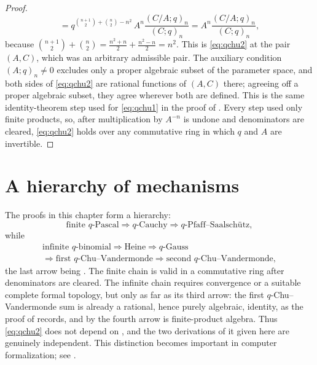 \documentclass[11pt,oneside,openany]{book}
\theoremstyle{definition}
\theoremstyle{remark}
\newcommand{\C}{\mathbb C}
\newcommand{\Q}{\mathbb Q}
\begin{document}
\begin{proof}
\[ =q^{\binom{n+1}{2}+\binom n2-n^2}\,A^{n}\frac{(C/A;q)_n}{(C;q)_n}
 =A^{n}\frac{(C/A;q)_n}{(C;q)_n},
\]
because $\binom{n+1}{2}+\binom n2=\tfrac{n^2+n}{2}+\tfrac{n^2-n}{2}=n^2$.  This is \eqref{eq:qchu2} at the pair $(A,C)$, which was an arbitrary admissible pair.  The auxiliary condition $(A;q)_n\ne0$ excludes only a proper algebraic
subset of the parameter space, and both sides of \eqref{eq:qchu2} are
rational functions of $(A,C)$ there; agreeing off a proper algebraic
subset, they agree wherever both are defined.  This is the same
identity-theorem step used for \eqref{eq:qchu1} in the proof of
.
Every step used only finite products, so, after multiplication by $A^{-n}$ is undone and denominators are cleared, \eqref{eq:qchu2} holds over any commutative ring in which $q$ and $A$ are invertible.
\end{proof}


\section{A hierarchy of mechanisms}

The proofs in this chapter form a hierarchy:
\[
 \text{finite $q$-Pascal}
 \Longrightarrow \text{$q$-Cauchy}
 \Longrightarrow \text{$q$-Pfaff--Saalsch\"utz},
\]
while
\[
\begin{gathered}
 \text{infinite $q$-binomial}
 \Longrightarrow \text{Heine}
 \Longrightarrow \text{$q$-Gauss}\\
 \Longrightarrow \text{first $q$-Chu--Vandermonde}
 \Longrightarrow \text{second $q$-Chu--Vandermonde},
\end{gathered}
\]
the last arrow being .  The finite chain is valid in a commutative ring after denominators are cleared.  The infinite chain requires convergence or a suitable complete formal topology, but only as far as its third arrow: the first $q$-Chu--Vandermonde sum is already a rational, hence purely algebraic, identity, as the proof of  records, and by  the fourth arrow is finite-product algebra.  Thus \eqref{eq:qchu2} does not depend on , and the two derivations of it given here are genuinely independent.  This distinction becomes important in computer formalization; see .
\end{document}
